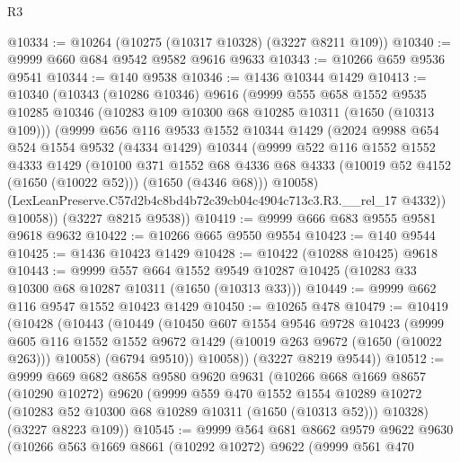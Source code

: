 \begin{lexlean}{R3}
\begin{coremodule}
@10334 := @10264 (@10275 (@10317 @10328) (@3227 @8211 @109))
@10340 := @9999 @660 @684 @9542 @9582 @9616 @9633
@10343 := @10266 @659 @9536 @9541
@10344 := @140 @9538
@10346 := @1436 @10344 @1429
@10413 := @10340
    (@10343
      (@10286 @10346)
      @9616
      (@9999
        @555
        @658
        @1552
        @9535
        @10285
        @10346
        (@10283 @109 @10300 @68 @10285 @10311 (@1650 (@10313 @109)))
        (@9999
          @656
          @116
          @9533
          @1552
          @10344
          @1429
          (@2024
            @9988
            @654
            @524
            @1554
            @9532
            (@4334 @1429)
            @10344
            (@9999
              @522
              @116
              @1552
              @1552
              @4333
              @1429
              (@10100
                @371
                @1552
                @68
                @4336
                @68
                @4333
                (@10019 @52 @4152 (@1650 (@10022 @52)))
                (@1650 (@4346 @68)))
              @10058)
            (LexLeanPreserve.C57d2b4c8bd4b72c39cb04c4904c713c3.R3.__rel_17 @4332))
          @10058))
      (@3227 @8215 @9538))
@10419 := @9999 @666 @683 @9555 @9581 @9618 @9632
@10422 := @10266 @665 @9550 @9554
@10423 := @140 @9544
@10425 := @1436 @10423 @1429
@10428 := @10422 (@10288 @10425) @9618
@10443 := @9999
    @557
    @664
    @1552
    @9549
    @10287
    @10425
    (@10283 @33 @10300 @68 @10287 @10311 (@1650 (@10313 @33)))
@10449 := @9999 @662 @116 @9547 @1552 @10423 @1429
@10450 := @10265 @478
@10479 := @10419
    (@10428
      (@10443
        (@10449
          (@10450
            @607
            @1554
            @9546
            @9728
            @10423
            (@9999
              @605
              @116
              @1552
              @1552
              @9672
              @1429
              (@10019 @263 @9672 (@1650 (@10022 @263)))
              @10058)
            (@6794 @9510))
          @10058))
      (@3227 @8219 @9544))
@10512 := @9999
    @669
    @682
    @8658
    @9580
    @9620
    @9631
    (@10266
      @668
      @1669
      @8657
      (@10290 @10272)
      @9620
      (@9999
        @559
        @470
        @1552
        @1554
        @10289
        @10272
        (@10283 @52 @10300 @68 @10289 @10311 (@1650 (@10313 @52)))
        @10328)
      (@3227 @8223 @109))
@10545 := @9999
    @564
    @681
    @8662
    @9579
    @9622
    @9630
    (@10266
      @563
      @1669
      @8661
      (@10292 @10272)
      @9622
      (@9999
        @561
        @470

\end{coremodule}
\end{lexlean}
